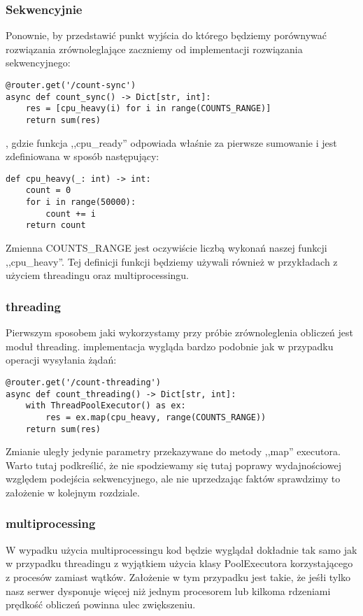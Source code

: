 \subsubsection{Sekwencyjnie}
Ponownie, by przedstawić punkt wyjścia do którego będziemy porównywać rozwiązania zrównoleglające zaczniemy od implementacji rozwiązania sekwencyjnego:
\begin{lstlisting}
@router.get('/count-sync')
async def count_sync() -> Dict[str, int]:
    res = [cpu_heavy(i) for i in range(COUNTS_RANGE)]
    return sum(res)
\end{lstlisting}
, gdzie funkcja ,,cpu\_ready'' odpowiada właśnie za pierwsze sumowanie i jest zdefiniowana w sposób następujący:
\begin{lstlisting}
def cpu_heavy(_: int) -> int:
    count = 0
    for i in range(50000):
        count += i
    return count
\end{lstlisting}
Zmienna COUNTS\_RANGE jest oczywiście liczbą wykonań naszej funkcji  ,,cpu\_heavy''. Tej definicji funkcji będziemy używali również w przykładach z użyciem threadingu oraz multiprocessingu.

\subsubsection{threading}
Pierwszym sposobem jaki wykorzystamy przy próbie zrównoleglenia obliczeń jest moduł threading. implementacja wygląda bardzo podobnie jak w przypadku operacji wysyłania żądań:
\begin{lstlisting}
@router.get('/count-threading')
async def count_threading() -> Dict[str, int]:
    with ThreadPoolExecutor() as ex:
        res = ex.map(cpu_heavy, range(COUNTS_RANGE))
    return sum(res)
\end{lstlisting}
Zmianie uległy jedynie parametry przekazywane do metody ,,map'' executora. Warto tutaj podkreślić, że nie spodziewamy się tutaj poprawy wydajnościowej względem podejścia sekwencyjnego, ale nie uprzedzając faktów sprawdzimy to założenie w kolejnym rozdziale.

\subsubsection{multiprocessing}
W wypadku użycia multiprocessingu kod będzie wyglądał dokładnie tak samo jak w przypadku threadingu z wyjątkiem użycia klasy PoolExecutora korzystającego z procesów zamiast wątków. Założenie w tym przypadku jest takie, że jeśłi tylko nasz serwer dysponuje więcej niż jednym procesorem lub kilkoma rdzeniami prędkość obliczeń powinna ulec zwiększeniu.

